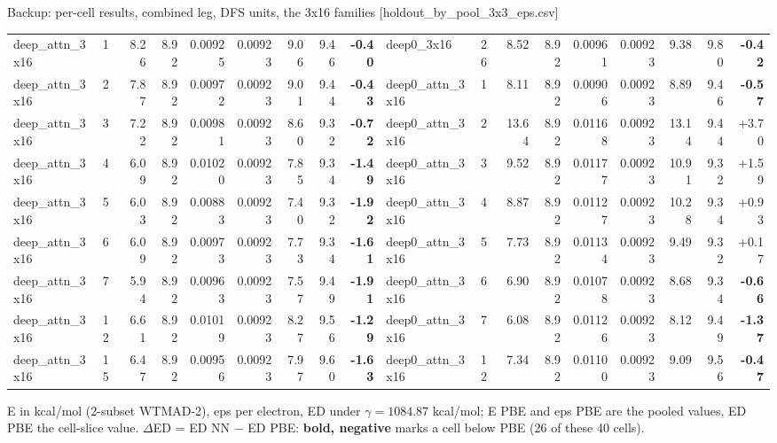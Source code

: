 \begin{frame}[label=b6]{Backup: per-cell results, combined leg, DFS units, the 3x16 families [holdout\_by\_pool\_3x3\_eps.csv]}
\begin{center}
\begin{tabular}{llrrrrrrr|llrrrrrrr}
  deep\_attn\_3x16 & 1 & 8.26 & 8.92 & 0.00925 & 0.00923 & 9.06 & 9.46 & \textbf{-0.40} & deep0\_3x16 & 26 & 8.52 & 8.92 & 0.00961 & 0.00923 & 9.38 & 9.80 & \textbf{-0.42} \\
  deep\_attn\_3x16 & 2 & 7.87 & 8.92 & 0.00972 & 0.00923 & 9.01 & 9.44 & \textbf{-0.43} & deep0\_attn\_3x16 & 1 & 8.11 & 8.92 & 0.00906 & 0.00923 & 8.89 & 9.46 & \textbf{-0.57} \\
  deep\_attn\_3x16 & 3 & 7.22 & 8.92 & 0.00981 & 0.00923 & 8.60 & 9.32 & \textbf{-0.72} & deep0\_attn\_3x16 & 2 & 13.64 & 8.92 & 0.01168 & 0.00923 & 13.14 & 9.44 & +3.70 \\
  deep\_attn\_3x16 & 4 & 6.09 & 8.92 & 0.01020 & 0.00923 & 7.85 & 9.34 & \textbf{-1.49} & deep0\_attn\_3x16 & 3 & 9.52 & 8.92 & 0.01177 & 0.00923 & 10.91 & 9.32 & +1.59 \\
  deep\_attn\_3x16 & 5 & 6.03 & 8.92 & 0.00883 & 0.00923 & 7.40 & 9.32 & \textbf{-1.92} & deep0\_attn\_3x16 & 4 & 8.87 & 8.92 & 0.01127 & 0.00923 & 10.28 & 9.34 & +0.93 \\
  deep\_attn\_3x16 & 6 & 6.09 & 8.92 & 0.00973 & 0.00923 & 7.73 & 9.34 & \textbf{-1.61} & deep0\_attn\_3x16 & 5 & 7.73 & 8.92 & 0.01134 & 0.00923 & 9.49 & 9.32 & +0.17 \\
  deep\_attn\_3x16 & 7 & 5.94 & 8.92 & 0.00963 & 0.00923 & 7.57 & 9.49 & \textbf{-1.91} & deep0\_attn\_3x16 & 6 & 6.90 & 8.92 & 0.01078 & 0.00923 & 8.68 & 9.34 & \textbf{-0.66} \\
  deep\_attn\_3x16 & 12 & 6.61 & 8.92 & 0.01019 & 0.00923 & 8.27 & 9.56 & \textbf{-1.29} & deep0\_attn\_3x16 & 7 & 6.08 & 8.92 & 0.01126 & 0.00923 & 8.12 & 9.49 & \textbf{-1.37} \\
  deep\_attn\_3x16 & 15 & 6.47 & 8.92 & 0.00956 & 0.00923 & 7.97 & 9.60 & \textbf{-1.63} & deep0\_attn\_3x16 & 12 & 7.34 & 8.92 & 0.01100 & 0.00923 & 9.09 & 9.56 & \textbf{-0.47} \\
  \bottomrule
  \end{tabular}
  \end{center}
  \scriptsize
  E in kcal/mol (2-subset WTMAD-2), eps per electron, ED under $\gamma = 1084.87$ kcal/mol; E PBE and eps PBE are the pooled values, ED PBE the cell-slice value. $\Delta$ED = ED NN $-$ ED PBE: \textbf{bold, negative} marks a cell below PBE (26 of these 40 cells).
  \hfill \hyperlink{f34}{}
\end{frame}
